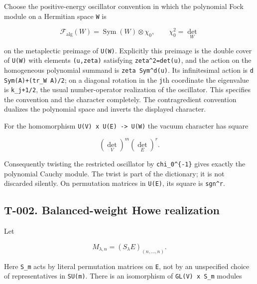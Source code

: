 \documentclass[
  10pt,
]{article}
\begin{document}
Choose the positive-energy oscillator convention in which the polynomial
Fock module on a Hermitian space \texttt{\small W} is

\[
\mathcal F_{\mathrm{alg}}(W)=\operatorname{Sym}(W)\otimes\chi_0,
\qquad \chi_0^2=\det_W
\]

on the metaplectic preimage of
\texttt{\small U(\allowbreak{}W)\allowbreak{}}. Explicitly this preimage
is the double cover of \texttt{\small U(\allowbreak{}W)\allowbreak{}}
with elements
\texttt{\small (\allowbreak{}u,\allowbreak{}zeta)\allowbreak{}}
satisfying
\texttt{\small zeta\textasciicircum{}2=\allowbreak{}det(\allowbreak{}u)\allowbreak{}},
and the action on the homogeneous polynomial summand is
\texttt{\small zeta Sym\textasciicircum{}d(\allowbreak{}u)\allowbreak{}}.
Its infinitesimal action is
\texttt{\small d Sym(\allowbreak{}A)\allowbreak{}+\allowbreak{}(\allowbreak{}tr\_\allowbreak{}W A)\allowbreak{}/\allowbreak{}2};
on a diagonal rotation in the \texttt{\small j}th coordinate the
eigenvalue is
\texttt{\small k\_\allowbreak{}j+\allowbreak{}1/\allowbreak{}2}, the
usual number-operator realization of the oscillator. This specifies the
convention and the character completely. The contragredient convention
dualizes the polynomial space and inverts the displayed character.

For the homomorphism
\texttt{\small U(\allowbreak{}V)\allowbreak{} x U(\allowbreak{}E)\allowbreak{} -\allowbreak{}> U(\allowbreak{}W)\allowbreak{}}
the vacuum character has square

\[
(\det_V)^m(\det_E)^r.
\]

Consequently twisting the restricted oscillator by
\texttt{\small chi\_\allowbreak{}0\textasciicircum{}\{-\allowbreak{}1\}}
gives exactly the polynomial Cauchy module. The twist is part of the
dictionary; it is not discarded silently. On permutation matrices in
\texttt{\small U(\allowbreak{}E)\allowbreak{}}, its square is
\texttt{\small sgn\textasciicircum{}r}.

\subsection{T-002. Balanced-weight Howe
realization}\label{t-002.-balanced-weight-howe-realization}

Let

\[
M_{\lambda,n}=(S_\lambda E)_{(n,\ldots,n)}.
\]

Here \texttt{\small S\_\allowbreak{}m} acts by literal permutation
matrices on \texttt{\small E}, not by an unspecified choice of
representatives in \texttt{\small SU(\allowbreak{}m)\allowbreak{}}.
There is an isomorphism of
\texttt{\small GL(\allowbreak{}V)\allowbreak{} x S\_\allowbreak{}m}
modules
\end{document}
